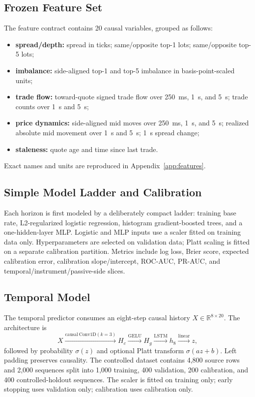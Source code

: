 \documentclass[journal,10pt]{IEEEtran}
\newcommand{\R}{\mathbb{R}}
\newcommand{\1}{\mathbf{1}}
\begin{document}
\subsection{Frozen Feature Set}
The feature contract contains 20 causal variables, grouped as follows:
\begin{itemize}[leftmargin=*]
    \item \textbf{spread/depth:} spread in ticks; same/opposite top-1 lots; same/opposite top-5 lots;
    \item \textbf{imbalance:} side-aligned top-1 and top-5 imbalance in basis-point-scaled units;
    \item \textbf{trade flow:} toward-quote signed trade flow over 250~ms, 1~s, and 5~s; trade counts over 1~s and 5~s;
    \item \textbf{price dynamics:} side-aligned mid moves over 250~ms, 1~s, and 5~s; realized absolute mid movement over 1~s and 5~s; 1~s spread change;
    \item \textbf{staleness:} quote age and time since last trade.
\end{itemize}
Exact names and units are reproduced in Appendix~\ref{app:features}.

\subsection{Simple Model Ladder and Calibration}
Each horizon is first modeled by a deliberately compact ladder: training base rate, L2-regularized logistic regression, histogram gradient-boosted trees, and a one-hidden-layer MLP. Logistic and MLP inputs use a scaler fitted on training data only. Hyperparameters are selected on validation data; Platt scaling is fitted on a separate calibration partition. Metrics include log loss, Brier score, expected calibration error, calibration slope/intercept, ROC-AUC, PR-AUC, and temporal/instrument/passive-side slices.

\subsection{Temporal Model}
The temporal predictor consumes an eight-step causal history $X\in\R^{8\times20}$. The architecture is
\begin{equation}
X \xrightarrow{\mathrm{causal\ Conv1D}(k=3)} H_c
\xrightarrow{\mathrm{GELU}} H_g
\xrightarrow{\mathrm{LSTM}} h_8
\xrightarrow{\mathrm{linear}} z,
\label{eq:temporal}
\end{equation}
followed by probability $\sigma(z)$ and optional Platt transform $\sigma(az+b)$. Left padding preserves causality. The controlled dataset contains 4,800 source rows and 2,000 sequences split into 1,000 training, 400 validation, 200 calibration, and 400 controlled-holdout sequences. The scaler is fitted on training only; early stopping uses validation only; calibration uses calibration only.
\end{document}
